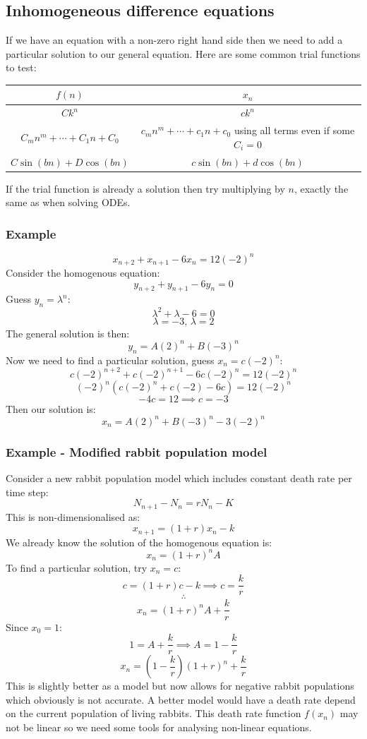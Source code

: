 \documentclass[12pt]{article}
\begin{document}
\subsection*{Inhomogeneous difference equations}
If we have an equation with a non-zero right hand side then we need to add a particular solution to our general equation. Here are some common trial functions to test:
\begin{table}[H]
    \begin{tabular}{c|c}
        \(f(n)\) &  \(x_n\) \\ \hline
        \(Ck^n\) & \(ck^n\) \\
        \(C_mn^m+\cdots+C_1n+C_0\) & \(c_mn^m+\cdots+c_1n+c_0\) using all terms even if some \(C_i=0\) \\
        \(C\sin(bn)+D\cos({bn})\) & \(c\sin(bn)+d\cos(bn)\)
    \end{tabular}
\end{table}
If the trial function is already a solution then try multiplying by \(n\), exactly the same as when solving ODEs.
\subsubsection*{Example}
\[x_{n+2}+x_{n+1}-6x_n=12(-2)^n\]
Consider the homogenous equation:
\[y_{n+2}+y_{n+1}-6y_n=0\]
Guess \(y_n=\lambda^n\):
\[\lambda^2+\lambda-6=0\]
\[\lambda=-3,\, \lambda=2\]
The general solution is then:
\[y_n=A(2)^n+B(-3)^n\]
Now we need to find a particular solution, guess \(x_n=c(-2)^n\):
\[c(-2)^{n+2}+c(-2)^{n+1}-6c(-2)^n=12(-2)^n\]
\[(-2)^n(c(-2)^n+c(-2)-6c)=12(-2)^n\]
\[-4c=12\implies c=-3\]
Then our solution is:
\[x_n=A(2)^n+B(-3)^n-3(-2)^n\]
\subsubsection*{Example - Modified rabbit population model}
Consider a new rabbit population model which includes constant death rate per time step:
\[N_{n+1}-N_n=rN_n-K\]
This is non-dimensionalised as:
\[x_{n+1}=(1+r)x_n-k\]
We already know the solution of the homogenous equation is:
\[x_n=(1+r)^nA\]
To find a particular solution, try \(x_n=c\):
\[c=(1+r)c-k\implies c=\frac{k}{r}\]
\[\therefore\]
\[x_n=(1+r)^nA+\frac{k}{r}\]
Since \(x_0=1\):
\[1=A+\frac{k}{r}\implies A=1-\frac{k}{r}\]
\[x_n=(1-\frac{k}{r})(1+r)^n+\frac{k}{r}\]
This is slightly better as a model but now allows for negative rabbit populations which obviously is not accurate. A better model would have a death rate depend on the current population of living rabbits. This death rate function \(f(x_n)\) may not be linear so we need some tools for analysing non-linear equations.
\end{document}
